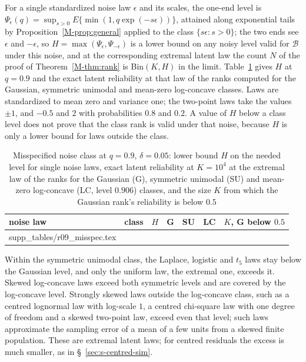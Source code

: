 \documentclass[12pt]{article}
\makeatletter
\newcommand{\tabinput}[1]{\@@input #1 }
\renewcommand{\_}{\usc\allowbreak}
\theoremstyle{definition}
\numberwithin{equation}{section}
\newcommand{\B}{\mathcal{B}}
\makeatother
\begin{document}
For a single standardized noise law $\epsilon$ and its scales, the one-end level is $\Psi_\epsilon(q) = \sup_{s > 0}E\{\min(1, q\exp(-s\epsilon))\}$, attained along exponential tails by Proposition~\ref{M-prop:general} applied to the class $\{s\epsilon : s > 0\}$; the two ends see $\epsilon$ and $-\epsilon$, so $H = \max(\Psi_\epsilon, \Psi_{-\epsilon})$ is a lower bound on any noisy level valid for $\B$ under this noise, and at the corresponding extremal latent law the count $N$ of the proof of Theorem~\ref{M-thm:rank} is Bin$(K, H)$ in the limit. Table~\ref{tab:s-misspec} gives $H$ at $q = 0.9$ and the exact latent reliability at that law of the ranks computed for the Gaussian, symmetric unimodal and mean-zero log-concave classes. Laws are standardized to mean zero and variance one; the two-point laws take the values $\pm 1$, and $-0.5$ and $2$ with probabilities $0.8$ and $0.2$. A value of $H$ below a class level does not prove that the class rank is valid under that noise, because $H$ is only a lower bound for laws outside the class.

\begin{table}[htbp]
\renewcommand{\baselinestretch}{1}
\caption{Misspecified noise class at $q = 0.9$, $\delta = 0.05$: lower bound $H$ on the needed level for single noise laws, exact latent reliability at $K = 10^4$ at the extremal law of the ranks for the Gaussian (G), symmetric unimodal (SU) and mean-zero log-concave (LC, level $0.906$) classes, and the size $K$ from which the Gaussian rank's reliability is below $0.5$}
\label{tab:s-misspec}
\centering
\fontsize{8}{10pt}\selectfont
\begin{tabular}{llccccc}
\toprule
noise law & class & $H$ & G & SU & LC & $K$, G below $0.5$ \\
\midrule
\tabinput{supp_tables/r09_misspec.tex}
\bottomrule
\end{tabular}
\end{table}

Within the symmetric unimodal class, the Laplace, logistic and $t_5$ laws stay below the Gaussian level, and only the uniform law, the extremal one, exceeds it. Skewed log-concave laws exceed both symmetric levels and are covered by the log-concave level. Strongly skewed laws outside the log-concave class, such as a centred lognormal law with log-scale $1$, a centred chi-square law with one degree of freedom and a skewed two-point law, exceed even that level; such laws approximate the sampling error of a mean of a few units from a skewed finite population. These are extremal latent laws; for centred residuals the excess is much smaller, as in \S~\ref{sec:s-centred-sim}.
\end{document}
